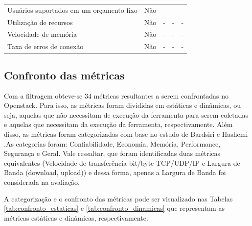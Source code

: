 \documentclass[conference]{IEEEtran}
\begin{document}
\begin{table}[]
\begin{tabular}{@{}lcccc@{}}
Usuários suportados em um orçamento fixo          & \cellcolor[HTML]{EA9999}Não             & \cellcolor[HTML]{EA9999}-               & \cellcolor[HTML]{EA9999}-               & \cellcolor[HTML]{EA9999}-   \\
Utilização de recursos                            & \cellcolor[HTML]{EA9999}Não             & \cellcolor[HTML]{EA9999}-               & \cellcolor[HTML]{EA9999}-               & \cellcolor[HTML]{EA9999}-   \\
Velocidade de memória                             & \cellcolor[HTML]{EA9999}Não             & \cellcolor[HTML]{EA9999}-               & \cellcolor[HTML]{EA9999}-               & \cellcolor[HTML]{EA9999}-   \\
Taxa de erros de conexão                          & \cellcolor[HTML]{EA9999}Não             & \cellcolor[HTML]{EA9999}-               & \cellcolor[HTML]{EA9999}-               & \cellcolor[HTML]{EA9999}-   \\ \bottomrule
\end{tabular}
\end{table}
   
  \subsection{Confronto das métricas} \label{confronto}
  
  Com a filtragem obteve-se 34 métricas resultantes a serem confrontadas no Openstack. Para isso, as métricas foram divididas em estáticas e
  dinâmicas, ou seja, aquelas que não necessitam de execução da ferramenta para serem coletadas e aquelas que necessitam da execução da ferramenta,
  respectivamente. Além disso, as métricas foram categorizadas com base no estudo de Bardsiri e Hashemi \cite{bardsiri2014}.As categorias foram:
  Confiabilidade, Economia, Memória, Performance, Segurança e Geral. Vale ressaltar, que foram identificadas duas métricas equivalentes (Velocidade de transferência bit/byte TCP/UDP/IP
  e Largura de Banda (download, upload)) e dessa forma, apenas a Largura de Banda foi considerada na avaliação.
  
  A categorização e o confronto das métricas pode ser visualizado nas Tabelas   \ref{tab:confronto_estaticas} e \ref{tab:confronto_dinamicas}  
 que representam as métricas estáticas e dinâmicas, respectivamente. 
\end{document}
